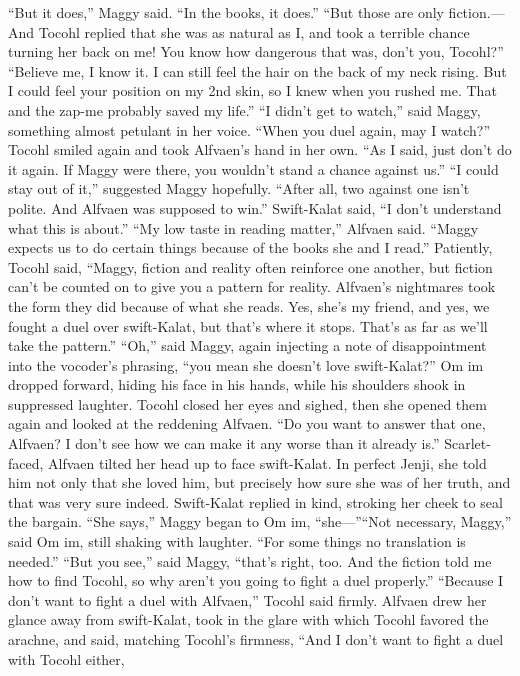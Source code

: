 \documentclass[9pt]{article}
\begin{document}
“But it does,” Maggy said. “In the books, it does.”
“But those are only fiction.—And Tocohl replied that she was as natural as I, and took a terrible
chance turning her back on me! You know how dangerous that was, don’t you, Tocohl?”
“Believe me, I know it. I can still feel the hair on the back of my neck rising. But I could feel your
position on my 2nd skin, so I knew when you rushed me. That and the zap-me probably saved my life.”
“I didn’t get to watch,” said Maggy, something almost petulant in her voice. “When you duel again,
may I watch?”
Tocohl smiled again and took Alfvaen’s hand in her own. “As I said, just don’t do it again. If Maggy
were there, you wouldn’t stand a chance against us.”
“I could stay out of it,” suggested Maggy hopefully. “After all, two against one isn’t polite. And
Alfvaen was supposed to win.”
Swift-Kalat said, “I don’t understand what this is about.”
“My low taste in reading matter,” Alfvaen said. “Maggy expects us to do certain things because of
the books she and I read.”
Patiently, Tocohl said, “Maggy, fiction and reality often reinforce one another, but fiction can’t be
counted on to give you a pattern for reality. Alfvaen’s nightmares took the form they did because of what
she reads. Yes, she’s my friend, and yes, we fought a duel over swift-Kalat, but that’s where it stops.
That’s as far as we’ll take the pattern.”
“Oh,” said Maggy, again injecting a note of disappointment into the vocoder’s phrasing, “you mean
she doesn’t love swift-Kalat?”
Om im dropped forward, hiding his face in his hands, while his shoulders shook in suppressed
laughter. Tocohl closed her eyes and sighed, then she opened them again and looked at the reddening
Alfvaen. “Do you want to answer that one, Alfvaen? I don’t see how we can make it any worse than it
already is.”
Scarlet-faced, Alfvaen tilted her head up to face swift-Kalat. In perfect Jenji, she told him not only
that she loved him, but precisely how sure she was of her truth, and that was very sure indeed.
Swift-Kalat replied in kind, stroking her cheek to seal the bargain.
“She says,” Maggy began to Om im, “she—”“Not necessary, Maggy,” said Om im, still shaking with laughter. “For some things no translation is
needed.”
“But you see,” said Maggy, “that’s right, too. And the fiction told me how to find Tocohl, so why
aren’t you going to fight a duel properly.”
“Because I don’t want to fight a duel with Alfvaen,” Tocohl said firmly.
Alfvaen drew her glance away from swift-Kalat, took in the glare with which Tocohl favored the
arachne, and said, matching Tocohl’s firmness, “And I don’t want to fight a duel with Tocohl either,
\end{document}
